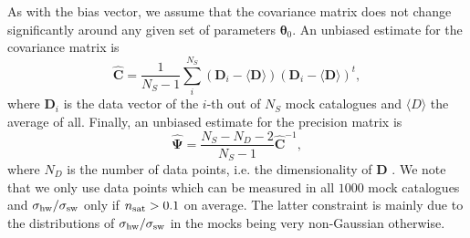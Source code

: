 \documentclass[fleqn,usenatbib,useAMS]{mnras}
\begin{document}
As with the bias vector, we assume that the covariance matrix does not change significantly around any given set of parameters $\boldsymbol{\theta}_0$. An unbiased estimate for the covariance matrix is
\begin{equation}
	\boldsymbol{\hat{C}} = \frac{1}{N_S - 1} \sum_i^{N_S} (\boldsymbol{D}_i - \langle \boldsymbol{D} \rangle) (\boldsymbol{D}_i - \langle \boldsymbol{D} \rangle)^t,
\end{equation}
where $\boldsymbol{D}_i$ is the data vector of the $i$-th out of $N_S$ mock catalogues and $\langle D \rangle$ the average of all. Finally, an unbiased estimate for the precision matrix is
\begin{equation}
	\boldsymbol{\hat{\Psi}} = \frac{N_S - N_D - 2}{N_S - 1} \boldsymbol{\hat{C}}^{-1},
	\label{eq:precision}
\end{equation}
where $N_D$ is the number of data points, i.e. the dimensionality of $\boldsymbol{D}$ \citep{Taylor+13}. We note that we only use data points which can be measured in all $1000$ mock catalogues and $\sigma_{\rm hw} / \sigma_{\rm sw}$ only if $n_{\rm sat} > 0.1$ on average. The latter constraint is mainly due to the distributions of $\sigma_{\rm hw} / \sigma_{\rm sw}$ in the mocks being very non-Gaussian otherwise.
\end{document}
